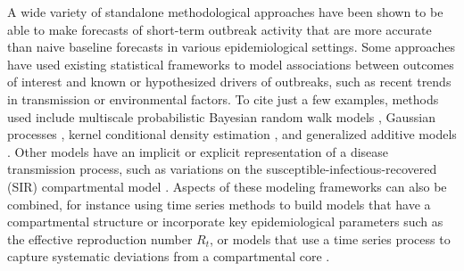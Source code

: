 \documentclass[11pt,3p,authoryear]{elsarticle}
\begin{document}
A wide variety of standalone methodological approaches have been shown to be able to make forecasts of short-term outbreak activity that are more accurate than naive baseline forecasts in various epidemiological settings.
Some approaches have used existing statistical frameworks to model associations between outcomes of interest and known or hypothesized drivers of outbreaks, such as recent trends in transmission or environmental factors.
To cite just a few examples, methods used include multiscale probabilistic Bayesian random walk models \citep{osthus_multiscale_2021}, Gaussian processes \citep{johnson_phenomenological_2018}, kernel conditional density estimation \citep{ray_infectious_2017,brooks_nonmechanistic_2018}, and generalized additive models \citep{lauer_prospective_2018}.
Other models have an implicit or explicit representation of a disease transmission process, such as variations on the susceptible-infectious-recovered (SIR) compartmental model \citep{shaman_forecasting_2012,lega_data-driven_2016,osthus_forecasting_2017,pei_forecasting_2018,turtle_accurate_2021}. Aspects of these modeling frameworks can also be combined, for instance using time series methods to build models that have a compartmental structure or incorporate key epidemiological parameters such as the effective reproduction number $R_t$, or models that use a time series process to capture systematic deviations from a compartmental core \citep{bartolucci_multivariate_2021, agosto_monitoring_2021, osthus_dynamic_2019}.
\end{document}
